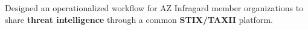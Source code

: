 


\begin{rExperience}

  \item Designed an operationalized workflow for AZ Infragard member organizations to share \textbf{threat intelligence} through a common \textbf{STIX/TAXII} platform.


\end{rExperience}
